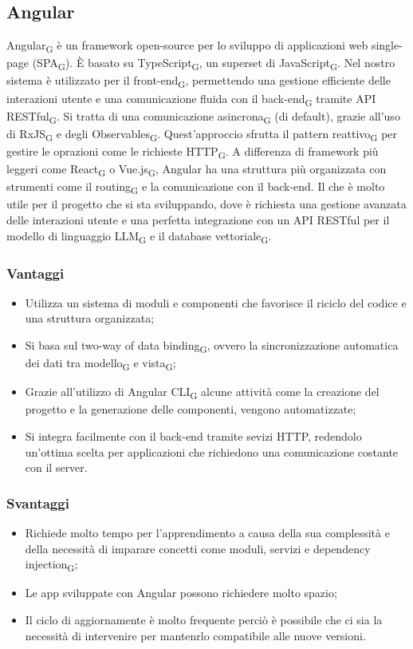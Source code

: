 \subsection{Angular}
Angular\textsubscript{G} è un framework open-source per lo sviluppo di applicazioni web single-page (SPA\textsubscript{G}). È basato su TypeScript\textsubscript{G}, un superset di JavaScript\textsubscript{G}. Nel nostro sistema è utilizzato per il front-end\textsubscript{G}, permettendo una gestione efficiente delle interazioni utente e una comunicazione fluida con il back-end\textsubscript{G} tramite API RESTful\textsubscript{G}. Si tratta di una comunicazione asincrona\textsubscript{G} (di default), grazie all'uso di RxJS\textsubscript{G} e degli Observables\textsubscript{G}. Quest'approccio sfrutta il pattern reattivo\textsubscript{G} per gestire le oprazioni come le richieste HTTP\textsubscript{G}. A differenza di framework più leggeri come React\textsubscript{G} o Vue.js\textsubscript{G}, Angular ha una struttura più organizzata con strumenti come il routing\textsubscript{G} e la comunicazione con il back-end. Il che è molto utile per il progetto che si sta sviluppando, dove è richiesta una gestione avanzata delle interazioni utente e una perfetta integrazione con un API RESTful per il modello di linguaggio LLM\textsubscript{G} e il database vettoriale\textsubscript{G}.
\subsubsection{Vantaggi}
\begin{itemize}
    \item Utilizza un sistema di moduli e componenti che favorisce il riciclo del codice e una struttura organizzata;
    \item Si basa sul two-way of data binding\textsubscript{G}, ovvero la sincronizzazione automatica dei dati tra modello\textsubscript{G} e vista\textsubscript{G};
    \item Grazie all'utilizzo di Angular CLI\textsubscript{G} alcune attività come la creazione del progetto e la generazione delle componenti, vengono automatizzate;
    \item Si integra facilmente con il back-end tramite sevizi HTTP, redendolo un'ottima scelta per applicazioni che richiedono una comunicazione costante con il server.
\end{itemize}
\subsubsection{Svantaggi}
\begin{itemize}
    \item Richiede molto tempo per l'apprendimento a causa della sua complessità e della necessità di imparare concetti come moduli, servizi e dependency injection\textsubscript{G};
    \item Le app sviluppate con Angular possono richiedere molto spazio;
    \item Il ciclo di aggiornamente è molto frequente perciò è possibile che ci sia la necessità di intervenire per mantenrlo compatibile alle nuove versioni.
\end{itemize}

